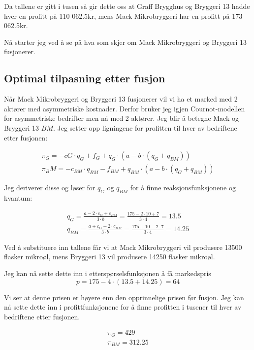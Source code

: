 \documentclass[
  12pt,
  a4paper,
  DIV=11,
  numbers=noendperiod]{scrartcl}
\begin{document}
Da tallene er gitt i tusen så gir dette oss at Graff Brygghus og
Bryggeri 13 hadde hver en profitt på 110 062.5kr, mens Mack
Mikrobryggeri har en profitt på 173 062.5kr.

Nå starter jeg ved å se på hva som skjer om Mack Mikrobryggeri og
Bryggeri 13 fusjonerer.

\clearpage

\subsection{Optimal tilpasning etter
fusjon}\label{optimal-tilpasning-etter-fusjon}

Når Mack Mikrobryggeri og Bryggeri 13 fusjonerer vil vi ha et marked med
2 aktører med asymmetriske kostnader. Derfor bruker jeg igjen
Cournot-modellen for asymmetriske bedrifter men nå med 2 aktører. Jeg
blir å betegne Mack og Bryggeri 13 \(BM\). Jeg setter opp ligningene for
profitten til hver av bedriftene etter fusjonen:

\begin{align*}
\pi_G = -cG \cdot q_G + f_G + q_G \cdot (a - b \cdot (q_G + q_{BM}))\\
\pi_BM = -c_{BM} \cdot q_{BM} - f_{BM} + q_{BM} \cdot (a - b \cdot (q_G + q_{BM}))
\end{align*}

Jeg deriverer disse og løser for \(q_G\) og \(q_{BM}\) for å finne
reaksjonsfunksjonene og kvantum:

\begin{align*}
q_G = \frac{a-2\cdot c_G + c_{BM}}{3\cdot b} = \frac{175-2\cdot 10 + 7}{3\cdot 4} =  13.5\\
q_{BM} = \frac{a + c_G -2\cdot c_{BM}}{3\cdot b} = \frac{175 + 10 -2\cdot 7}{3\cdot 4} = 14.25
\end{align*}

Ved å substituere inn tallene får vi at Mack Mikrobryggeri vil produsere
13500 flasker mikroøl, mens Bryggeri 13 vil produsere 14250 flasker
mikroøl.

Jeg kan nå sette dette inn i etterspørselsfunksjonen å få markedspris \[
p = 175 - 4 \cdot (13.5 + 14.25) = 64
\]

Vi ser at denne prisen er høyere enn den opprinnelige prisen før fusjon.
Jeg kan nå sette dette inn i profittfunksjonene for å finne profitten i
tusener til hver av bedriftene etter fusjonen.

\begin{align*}
\pi_G = 429 \\
\pi_{BM} = 312.25
\end{align*}
\end{document}
